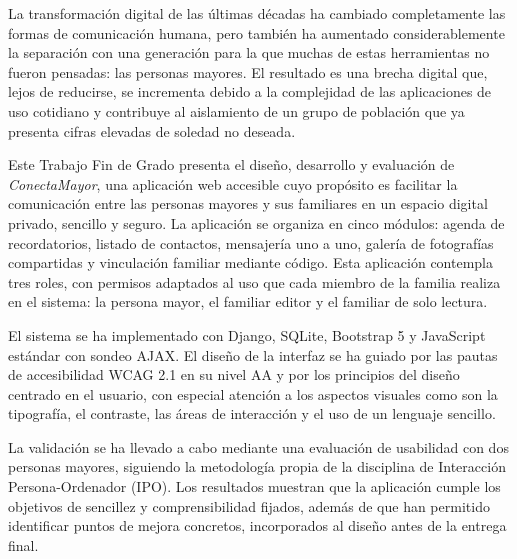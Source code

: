 
La transformación digital de las últimas décadas ha cambiado completamente las
formas de comunicación humana, pero también ha aumentado considerablemente la separación con una generación para la que muchas de estas herramientas no fueron pensadas: las
personas mayores. El resultado es una brecha digital que, lejos de reducirse, se incrementa debido a la complejidad de las aplicaciones de uso cotidiano y
contribuye al aislamiento de un grupo de población que ya presenta cifras
elevadas de soledad no deseada.

Este Trabajo Fin de Grado presenta el diseño, desarrollo y evaluación de
\emph{ConectaMayor}, una aplicación web accesible cuyo propósito es facilitar
la comunicación entre las personas mayores y sus familiares en un espacio
digital privado, sencillo y seguro. La aplicación se organiza en cinco módulos: agenda de recordatorios, listado de contactos, mensajería uno a uno, galería
de fotografías compartidas y vinculación familiar mediante código. Esta aplicación contempla
tres roles, con permisos adaptados al uso que cada miembro de la
familia realiza en el sistema: la persona mayor, el familiar editor y el familiar
de solo lectura.

El sistema se ha implementado con Django, SQLite, Bootstrap 5 y JavaScript
estándar con sondeo AJAX. El diseño de la interfaz se ha
guiado por las pautas de accesibilidad WCAG 2.1 en su nivel AA y por los
principios del diseño centrado en el usuario, con especial atención a los
aspectos visuales como son la tipografía, el contraste, las áreas de interacción y el uso de un lenguaje sencillo.

La validación se ha llevado a cabo mediante una evaluación de usabilidad con
dos personas mayores, siguiendo la metodología propia de la disciplina de
Interacción Persona-Ordenador (IPO). Los resultados muestran que la aplicación
cumple los objetivos de sencillez y comprensibilidad fijados, además de que han
permitido identificar puntos de mejora concretos, incorporados al diseño antes
de la entrega final.